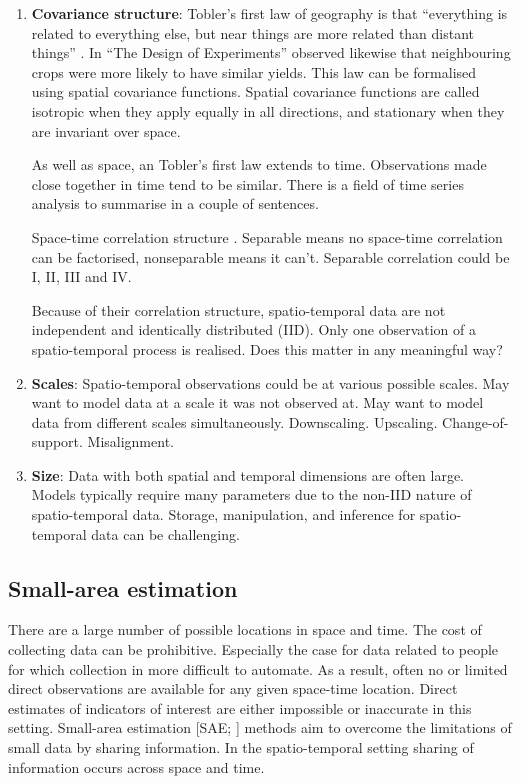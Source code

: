 \documentclass[a4paper, nobind]{templates/ociamthesis}
\begin{document}
\begin{enumerate}
\def\labelenumi{\arabic{enumi}.}
\item
  \textbf{Covariance structure}:
  Tobler's first law of geography is that ``everything is related to everything else, but near things are more related than distant things'' \autocite{tobler1970computer}.
  In ``The Design of Experiments'' \textcite{fisher1936design} observed likewise that neighbouring crops were more likely to have similar yields.
  This law can be formalised using spatial covariance functions.
  Spatial covariance functions are called isotropic when they apply equally in all directions, and stationary when they are invariant over space.

  As well as space, an Tobler's first law extends to time.
  Observations made close together in time tend to be similar.
  There is a field of time series analysis \autocite{hyndman2018forecasting} to summarise in a couple of sentences.

  Space-time correlation structure \autocite{porcu202130}.
  Separable means no space-time correlation can be factorised, nonseparable means it can't.
  Separable correlation could be \textcite{knorr2000bayesian} I, II, III and IV.

  Because of their correlation structure, spatio-temporal data are not independent and identically distributed (IID).
  Only one observation of a spatio-temporal process is realised.
  Does this matter in any meaningful way?
\item
  \textbf{Scales}:
  Spatio-temporal observations could be at various possible scales.
  May want to model data at a scale it was not observed at.
  May want to model data from different scales simultaneously.
  Downscaling.
  Upscaling.
  Change-of-support.
  Misalignment.
\item
  \textbf{Size}:
  Data with both spatial and temporal dimensions are often large.
  Models typically require many parameters due to the non-IID nature of spatio-temporal data.
  Storage, manipulation, and inference for spatio-temporal data can be challenging.
\end{enumerate}

\hypertarget{small-area-estimation}{%
\subsection{Small-area estimation}\label{small-area-estimation}}

There are a large number of possible locations in space and time.
The cost of collecting data can be prohibitive.
Especially the case for data related to people for which collection in more difficult to automate.
As a result, often no or limited direct observations are available for any given space-time location.
Direct estimates of indicators of interest are either impossible or inaccurate in this setting.
Small-area estimation {[}SAE; \textcite{pfeffermann2013new}{]} methods aim to overcome the limitations of small data by sharing information.
In the spatio-temporal setting sharing of information occurs across space and time.
\end{document}
